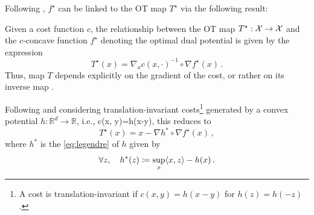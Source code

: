 Following \citet{gangbo1996geometry}, $f^\star$ can be linked to the \acrlong{OT} map $T^\star$ via the following result:
\begin{theorem} \label{thm:gangbo-mccann}
	Given a cost function $c$, the relationship between the \acrlong{OT} map $T^\star : {\mathcal{X}} \rightarrow {\mathcal{X}}$ and the $c$-concave function $f^\star$ denoting the optimal dual potential is given by the expression 
	\begin{equation}
		T^{\star}(x)=\nabla_x c(x, \cdot)^{-1} \circ \nabla f^{\star}(x)\,.
	\end{equation}
	Thus, map $T$ depends explicitly on the gradient of the cost, or rather on its inverse map \citep{gangbo1995optimal}. 
	
	Following \citet{gangbo1996geometry} and considering translation-invariant costs\footnote{A cost is translation-invariant if $c(x,y) = h(x-y)$ for $h(z) = h(-z)$.} generated by a convex potential $h: \mathbb{R}^d \rightarrow \mathbb{R}$, i.e., c(x, y)=h(x-y), this reduces to
	\begin{equation} \label{eq:gangbo_h}
		T^{\star}(x)=x-\nabla h^* \circ \nabla f^{\star}(x)\,,
	\end{equation}
	where $h^*$ is the \ref{eq:legendre} of $h$ given by
	\begin{equation}
		\forall z, \quad h^*(z) \coloneqq \sup _x \langle x, z\rangle-h(x)\,.
	\end{equation}

\end{theorem}
